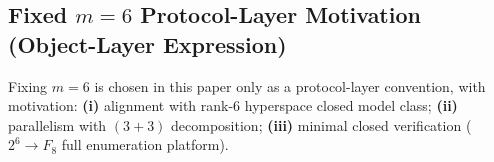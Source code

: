 \subsection{Fixed \texorpdfstring{$m=6$}{m=6} Protocol-Layer Motivation (Object-Layer Expression)}
Fixing $m=6$ is chosen in this paper only as a protocol-layer convention, with motivation: \textbf{(i)} alignment with rank-6 hyperspace closed model class; \textbf{(ii)} parallelism with $(3+3)$ decomposition; \textbf{(iii)} minimal closed verification ($2^6\to F_8$ full enumeration platform).
